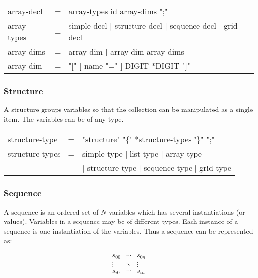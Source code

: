 \documentclass{article}
\begin{document}
\begin{ttfamily}
\begin{center}
\begin{tabular}{lll}
array-decl & = & array-types id array-dims ";" \\
array-types & = & simple-decl | structure-decl | sequence-decl | grid-decl \\
array-dims & = & array-dim | array-dim array-dims \\
array-dim & = & "[" [ name "=" ] DIGIT *DIGIT "]" \\
\end{tabular}
\end{center}
\end{ttfamily}

\subsubsection{Structure}
 A structure groups variables so that the collection can be
  manipulated as a single item. The variables can be of any type.

\begin{ttfamily}
\begin{center}
\begin{tabular}{lll}
structure-type & = & "structure" "\{" *structure-types "\}" ";" \\
structure-types & = & simple-type | list-type | array-type \\
                & & | structure-type | sequence-type | grid-type \\
\end{tabular}
\end{center}
\end{ttfamily}

\subsubsection{Sequence}
 A sequence is an ordered set of $N$ variables which has
  several instantiations (or values). Variables in a sequence may be of
  different types.  Each instance of a sequence is one instantiation of the
  variables. Thus a sequence can be represented as:

\begin{displaymath}
\begin{array}{ccc}
  s_{0 0} & \cdots & s_{0 n} \\
  \vdots & \ddots & \vdots \\
  s_{i 0} & \cdots & s_{i n}
\end{array}
\end{displaymath}
\end{document}
